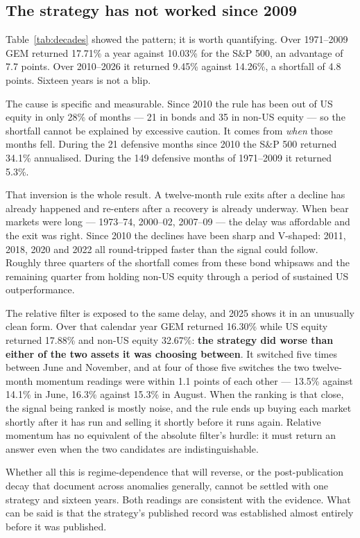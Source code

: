 \documentclass[11pt,a4paper]{article}
\begin{document}
\subsection{The strategy has not worked since 2009}

Table~\ref{tab:decades} showed the pattern; it is worth quantifying. Over
1971--2009 GEM returned 17.71\% a year against 10.03\% for the S\&P 500, an
advantage of 7.7 points. Over 2010--2026 it returned 9.45\% against 14.26\%, a
shortfall of 4.8 points. Sixteen years is not a blip.

The cause is specific and measurable. Since 2010 the rule has been out of US
equity in only 28\% of months --- 21 in bonds and 35 in non-US equity --- so
the shortfall cannot be explained by excessive caution. It comes from
\emph{when} those months fell. During the 21 defensive months since 2010 the
S\&P 500 returned 34.1\% annualised. During the 149 defensive months of
1971--2009 it returned 5.3\%.

That inversion is the whole result. A twelve-month rule exits after a decline
has already happened and re-enters after a recovery is already underway. When
bear markets were long --- 1973--74, 2000--02, 2007--09 --- the delay was
affordable and the exit was right. Since 2010 the declines have been sharp and
V-shaped: 2011, 2018, 2020 and 2022 all round-tripped faster than the signal
could follow. Roughly three quarters of the shortfall comes from these bond
whipsaws and the remaining quarter from holding non-US equity through a period
of sustained US outperformance.

The relative filter is exposed to the same delay, and 2025 shows it in an
unusually clean form. Over that calendar year GEM returned 16.30\% while US
equity returned 17.88\% and non-US equity 32.67\%: \textbf{the strategy did
worse than either of the two assets it was choosing between}. It switched five
times between June and November, and at four of those five switches the two
twelve-month momentum readings were within 1.1 points of each other --- 13.5\%
against 14.1\% in June, 16.3\% against 15.3\% in August. When the ranking is
that close, the signal being ranked is mostly noise, and the rule ends up
buying each market shortly after it has run and selling it shortly before it
runs again. Relative momentum has no equivalent of the absolute filter's
hurdle: it must return an answer even when the two candidates are
indistinguishable.

Whether all this is regime-dependence that will reverse, or the post-publication
decay that \citet{mclean2016} document across anomalies generally, cannot be
settled with one strategy and sixteen years. Both readings are consistent with
the evidence. What can be said is that the strategy's published record was
established almost entirely before it was published.
\end{document}
